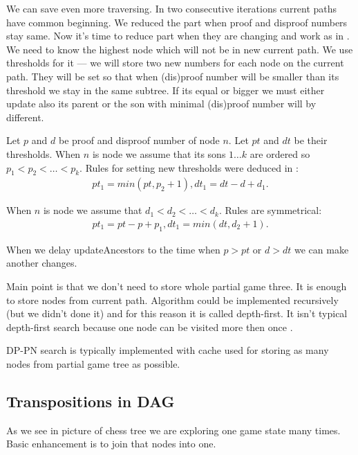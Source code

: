 We can save even more traversing. In two consecutive iterations current paths
have common beginning.  We reduced the part when proof and disproof
numbers stay same. Now it's time to reduce part when they are changing and work
as in . We need to know the highest node which will not be in new
current path. We use thresholds for it --- we will store two new numbers for
each node on the current path. They will be set so that when (dis)proof number
will be smaller than its threshold we stay in the same subtree. If its equal or
bigger we must either update also its parent or the son with minimal (dis)proof
number will by different. 

Let $p$ and $d$ be proof and disproof number of node $n$. Let $pt$ and $dt$ be
their thresholds. When $n$ is  node we assume that its sons $1\ldots k$
are ordered so $p_1 < p_2 < \ldots < p_k$. Rules for setting new thresholds
were deduced in : 
\begin{eqnarray*} 
	pt_1 = min(pt, p_2+1), dt_1 = dt - d + d_1.
\end{eqnarray*}

When $n$ is  node we assume that $d_1 < d_2 < \ldots < d_k$. Rules
are symmetrical:  
\begin{eqnarray*} 
	pt_1 = pt-p+p_1, dt_1 = min(dt,d_2+1).
\end{eqnarray*}

When we delay updateAncestors to the time when $p > pt$ or $d > dt$ we can make
another changes. 

Main point is that we don't need to store whole partial game three. It is
enough to store nodes from current path. Algorithm could be implemented
recursively (but we didn't done it) and for this reason it is called depth-first.
It isn't typical depth-first search because one node can be visited more
then once . 

DP-PN search is typically implemented with cache used for storing as many
nodes from partial game tree as possible. 

\subsection{Transpositions in DAG} \label{DAG}
 
As we see in picture  of chess tree we are exploring one
game state many times. Basic enhancement is to join that nodes into one.

